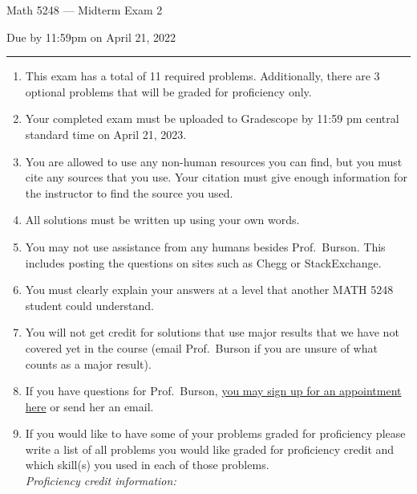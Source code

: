 \documentclass[11pt,addpoints,letterpaper]{exam}
\begin{document}
\vspace*{-0.5in}

\ifprintanswers
\begin{center}
\end{center}
\fi

{\centering

\LARGE Math 5248 --- Midterm Exam 2

}

\smallskip

{\centering

\large Due by 11:59pm on April 21, 2022

}

\bigskip\bigskip


\hrule

\begin{enumerate}[leftmargin=2em,rightmargin=1em]\setlength{\itemsep}{-2pt}


\item This exam has a total of 11 required problems.  Additionally, there are 3 optional problems that will be graded for proficiency only. 


\item Your completed exam must be uploaded to Gradescope by 11:59 pm central standard time on April 21, 2023.  

\item You are allowed to use any non-human resources you can find, but you must cite any sources that you use. Your citation must give enough information for the instructor to find the source you used. 

\item All solutions must be written up using your own words. 

\item You may not use assistance from any humans besides Prof.~Burson. This includes posting the questions on sites such as Chegg or StackExchange.  
\item You must clearly explain your answers at a level that another MATH 5248 student could understand.  

\item You will not get credit for solutions that use major results that we have not covered yet in the course (email Prof.~Burson if you are unsure of what counts as a major result). 

\item If you have questions for Prof.~Burson, \href{https://calendar.google.com/calendar/selfsched?sstoken=UURMcDY3OWhoVDI3fGRlZmF1bHR8ZGMyODk0OWZhNmE4NzQ0ZmUwYmY0ODk2N2I3NDFiYzk}{you may sign up for an appointment here} or send her an email. 

\item If you would like to have some of your problems graded for proficiency please write a list of all problems you would like graded for proficiency credit and which skill(s) you used in each of those problems. \\
\emph{Proficiency credit information:}




\end{enumerate}
\end{document}
